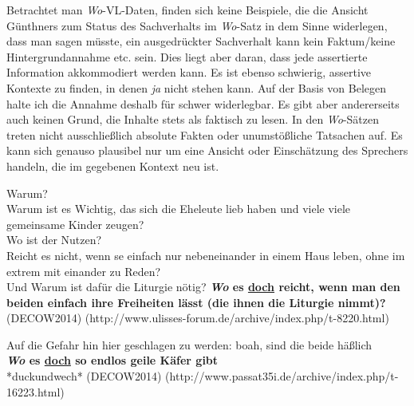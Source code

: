 {Betrachtet man \textit{Wo}-VL-Daten, finden sich keine Beispiele, die die Ansicht Günth\-ners zum Status des Sachverhalts im \textit{Wo}-Satz in dem Sinne widerlegen, dass man sagen müsste, ein ausgedrückter Sachverhalt kann kein Faktum/keine Hintergrundannahme etc. sein. Dies liegt aber daran, dass jede assertierte Information akkommodiert  werden kann. Es ist ebenso schwierig, assertive Kontexte zu finden, in denen \textit{ja} nicht stehen kann. Auf der Basis von Belegen halte ich die Annahme deshalb für schwer widerlegbar. Es gibt aber andererseits auch keinen Grund, die Inhalte stets als faktisch zu lesen. In den \textit{Wo}-Sätzen treten nicht ausschließlich absolute Fakten oder unumstößliche Tatsachen auf. Es kann sich genauso plausibel nur um eine Ansicht oder Einschätzung des Sprechers handeln, die im gegebenen Kontext neu ist.

\begin{exe}
	\ex\label{959}
	\scriptsize
	Warum?\\
	Warum ist es Wichtig, das sich die Eheleute \glqq lieb haben\grqq{} und viele viele gemeinsame Kinder zeugen?\\
	Wo ist der Nutzen?\\
	Reicht es nicht, wenn se einfach nur nebeneinander in einem Haus leben, ohne im extrem mit einander zu Reden?\\
	Und Warum ist dafür die Liturgie nötig? \textbf{\textit{Wo} es \underline{doch} reicht, wenn man den beiden einfach ihre Freiheiten lässt (die ihnen 		die Liturgie nimmt)?} 	
	\hfill\hbox{(DECOW2014)}
	\newline
	\hbox{}\hfill\hbox{(http://www.ulisses-forum.de/archive/index.php/t-8220.html)}
\end{exe}
 
\begin{exe}
	\ex\label{960}
	\scriptsize
	Auf die Gefahr hin hier geschlagen zu werden: boah, sind die beide häßlich\\
	\textbf{\textit{Wo} es \underline{doch} so endlos geile Käfer gibt}\\
	*duckundwech*			
	\hfill\hbox{(DECOW2014)}
	\newline
	\hbox{}\hfill\hbox{(http://www.passat35i.de/archive/index.php/t-16223.html)}
\end{exe}					                 

}
